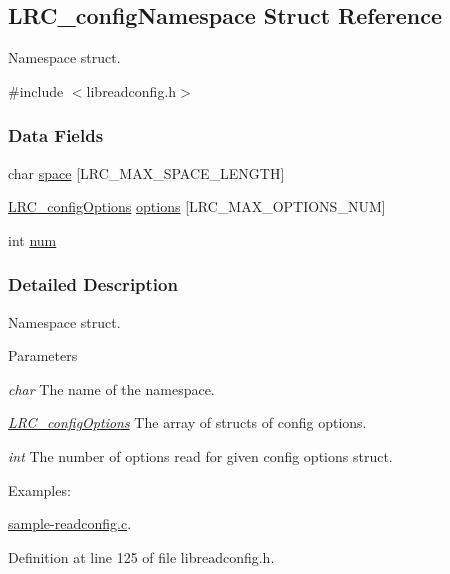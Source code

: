 \hypertarget{struct_l_r_c__config_namespace}{
\subsection{LRC\_\-configNamespace Struct Reference}
\label{struct_l_r_c__config_namespace}
}


Namespace struct.  


{\ttfamily \#include $<$libreadconfig.h$>$}\subsubsection*{Data Fields}
\begin{DoxyCompactItemize}
\item 
char \hyperlink{struct_l_r_c__config_namespace_a4754d9e0429a1914e3617de872b4a736}{space} \mbox{[}LRC\_\-MAX\_\-SPACE\_\-LENGTH\mbox{]}
\item 
\hyperlink{struct_l_r_c__config_options}{LRC\_\-configOptions} \hyperlink{struct_l_r_c__config_namespace_a16c789b044489f42de63f78f84b539ba}{options} \mbox{[}LRC\_\-MAX\_\-OPTIONS\_\-NUM\mbox{]}
\item 
int \hyperlink{struct_l_r_c__config_namespace_a86cf672daa4e0ad11ad10efc894d19c8}{num}
\end{DoxyCompactItemize}


\subsubsection{Detailed Description}
Namespace struct. 
\begin{DoxyParams}{Parameters}
\item[{\em char}]The name of the namespace.\item[{\em \hyperlink{struct_l_r_c__config_options}{LRC\_\-configOptions}}]The array of structs of config options.\item[{\em int}]The number of options read for given config options struct. \end{DoxyParams}
\begin{Desc}
\item[Examples: ]\par


\hyperlink{sample-readconfig_8c-example}{sample-\/readconfig.c}.\end{Desc}


Definition at line 125 of file libreadconfig.h.

